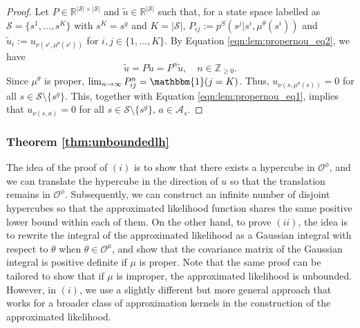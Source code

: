 \documentclass{amsart}
\begin{document}
\begin{proof}
Let $P \in \mathbb{R}^{|\mathcal{S}| \times |\mathcal{S}|}$ and $\tilde{u} \in \mathbb{R}^{|\mathcal{S}|}$ such that, for a state space labelled as $\mathcal{S}=\{s^1,\dots,s^K\}$ with $s^K=s^g$ and $K=|\mathcal{S}|$, $P_{ij}:=p^S(s^j|s^i,\mu^\theta(s^i))$ and $\tilde{u}_i:=u_{\nu(s^i,\mu^\theta(s^i))}$ for $i,j \in \{1,\dots,K\}$. By Equation \ref{eqn:lem:propernou_eq2}, we have
$$\tilde{u} = P \tilde{u}=P^n\tilde{u},\quad n \in \mathbb{Z}_{\geq 0}.$$
Since $\mu^\theta$ is proper, $\lim_{n \rightarrow \infty}P^n_{ij}=\mathbbm{1}(j=K)$. Thus, $u_{\nu(s,\mu^\theta(s))}=0$ for all $s \in \mathcal{S} \setminus \{s^g\}$. This, together with Equation \ref{eqn:lem:propernou_eq1}, implies that $u_{\nu(s,a)} = 0$ for all $s \in \mathcal{S} \setminus \{s^g\}$, $a \in \mathcal{A}_s$.
\end{proof}







 \subsubsection{Theorem \ref{thm:unboundedlh}}\label{apd:unboundedlhproof}
 
The idea of the proof of $(i)$ is to show that there exists a hypercube in $\mathcal{O}^\phi$, and we can translate the hypercube in the direction of $u$ so that the translation remains in $\mathcal{O}^\phi$. Subsequently, we can construct an infinite number of disjoint hypercubes so that the approximated likelihood function shares the same positive lower bound within each of them. On the other hand, to prove $(ii)$, the idea is to rewrite the integral of the approximated likelihood as a Gaussian integral with respect to $\theta$ when $\theta \in \mathcal{O}^\mu$, and show that the covariance matrix of the Gaussian integral is positive definite if $\mu$ is proper. Note that the same proof can be tailored to show that if $\mu$ is improper, the approximated likelihood is unbounded. However, in $(i)$, we use a slightly different but more general approach that works for a broader class of approximation kernels in the construction of the approximated likelihood.
\end{document}
